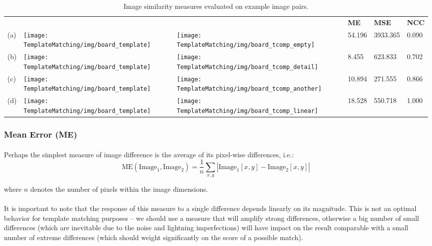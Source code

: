 \begin{table}[h!]
\centering
\begin{tabular}{| m{.02\linewidth} m{.13\linewidth} m{.13\linewidth} m{.12\linewidth} m{.12\linewidth} m{.12\linewidth} | }
\hline
 & & & \textbf{ME} & \textbf{MSE} & \textbf{NCC} \\
(a) & \texttt{[image: TemplateMatching/img/board\_template]} & 
\texttt{[image: TemplateMatching/img/board\_tcomp\_empty]} &
54.196 & 3933.365 & 0.090 \\
(b) & \texttt{[image: TemplateMatching/img/board\_template]} & 
\texttt{[image: TemplateMatching/img/board\_tcomp\_detail]} &
8.455 & 623.833 & 0.702 \\
(c) & \texttt{[image: TemplateMatching/img/board\_template]} & 
\texttt{[image: TemplateMatching/img/board\_tcomp\_another]} &
10.894 & 271.555 & 0.866 \\
(d) & \texttt{[image: TemplateMatching/img/board\_template]} & 
\texttt{[image: TemplateMatching/img/board\_tcomp\_linear]} &
18.528 & 550.718 & 1.000 \\ \hline
\end{tabular}
\caption{Image similarity measures evaluated on example image pairs.}
\label{tab:ImageSimilarityMeasures}
\end{table}

\subsubsection{Mean Error (ME)}

\paragraph*{}
Perhaps the simplest measure of image difference is the average of its pixel-wise differences, i.e.:
\[
	\mbox{ME}(\mbox{Image}_1,\mbox{Image}_2) = \frac{1}{n} \sum_{x,y} |\mbox{Image}_1[x,y] - \mbox{Image}_2[x,y]|
\]

where $n$ denotes the number of pixels within the image dimensions.

\paragraph*{}
It is important to note that the response of this measure to a single difference depends linearly on its magnitude. This is not an optimal behavior for template matching purposes -- we should use a measure that will amplify strong differences, otherwise a big number of small differences (which are inevitable due to the noise and lightning imperfections) will have impact on the result comparable with a small number of extreme differences (which should weight significantly on the score of a possible match).

